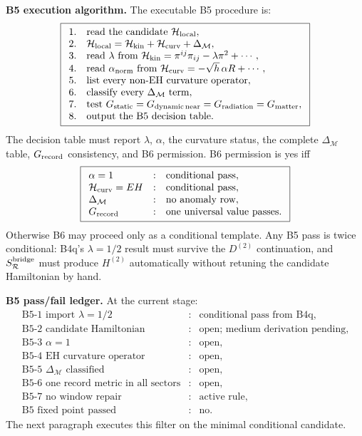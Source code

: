 \documentclass[11pt]{article}
\begin{document}
\medskip\noindent\textbf{B5 execution algorithm.}
The executable B5 procedure is:
\[
\boxed{
\begin{array}{ll}
1. & \text{read the candidate }{\cal H}_{\rm local},\\
2. & {\cal H}_{\rm local}
={\cal H}_{\rm kin}+{\cal H}_{\rm curv}+\Delta_{\mathcal M},\\
3. & \text{read }\lambda\text{ from }
{\cal H}_{\rm kin}=\pi^{ij}\pi_{ij}-\lambda\pi^2+\cdots,\\
4. & \text{read }\alpha_{\rm norm}\text{ from }
{\cal H}_{\rm curv}=-\sqrt h\,\alpha R+\cdots,\\
5. & \text{list every non-EH curvature operator},\\
6. & \text{classify every }\Delta_{\mathcal M}\text{ term},\\
7. & \text{test }G_{\rm static}=G_{\rm dynamic\,near}
=G_{\rm radiation}=G_{\rm matter},\\
8. & \text{output the B5 decision table.}
\end{array}}
\]
The decision table must report \(\lambda\), \(\alpha\), the curvature status,
the complete \(\Delta_{\mathcal M}\) table, \(G_{\rm record}\) consistency,
and B6 permission.  B6 permission is yes iff
\[
\boxed{
\begin{array}{lll}
\alpha=1 &:& \text{conditional pass},\\
{\cal H}_{\rm curv}=EH &:& \text{conditional pass},\\
\Delta_{\mathcal M} &:& \text{no anomaly row},\\
G_{\rm record} &:& \text{one universal value passes}.
\end{array}
}
\]
Otherwise B6 may proceed only as a conditional template.  Any B5 pass is
twice conditional: B4q's \(\lambda=1/2\) result must survive the \(D^{(2)}\)
continuation, and \(S_{\mathcal R}^{\rm bridge}\) must produce \(H^{(2)}\)
automatically without retuning the candidate Hamiltonian by hand.

\medskip\noindent\textbf{B5 pass/fail ledger.}
At the current stage:
\[
\boxed{
\begin{array}{lll}
\text{B5-1 import }\lambda=1/2 &:& \text{conditional pass from B4q},\\
\text{B5-2 candidate Hamiltonian} &:& \text{open; medium derivation pending},\\
\text{B5-3 }\alpha=1 &:& \text{open},\\
\text{B5-4 EH curvature operator} &:& \text{open},\\
\text{B5-5 }\Delta_{\mathcal M}\text{ classified} &:& \text{open},\\
\text{B5-6 one record metric in all sectors} &:& \text{open},\\
\text{B5-7 no window repair} &:& \text{active rule},\\
\text{B5 fixed point passed} &:& \text{no}.
\end{array}}
\]
The next paragraph executes this filter on the minimal conditional candidate.
\end{document}
